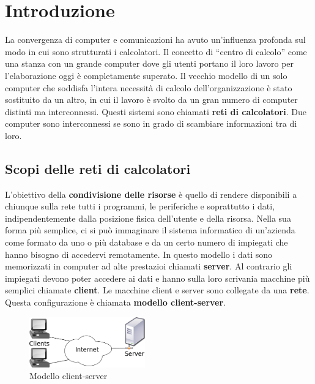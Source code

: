 \section{Introduzione}

La convergenza di computer e comunicazioni ha avuto un'influenza profonda sul modo in cui sono strutturati i calcolatori. Il concetto di ``centro di calcolo'' come una stanza con un grande computer dove gli utenti portano il loro lavoro per l'elaborazione oggi è completamente superato. Il vecchio modello di un solo computer che soddisfa l'intera necessità di calcolo dell'organizzazione è stato sostituito da un altro, in cui il lavoro è svolto da un gran numero di computer distinti ma interconnessi. Questi sistemi sono chiamati \textbf{reti di calcolatori}. Due computer sono interconnessi se sono in grado di scambiare informazioni tra di loro.

\subsection{Scopi delle reti di calcolatori}

L'obiettivo della \textbf{condivisione delle risorse} è quello di rendere disponibili a chiunque sulla rete tutti i programmi, le periferiche e soprattutto i dati, indipendentemente dalla posizione fisica dell'utente e della risorsa.
\linebreak
\linebreak
Nella sua forma più semplice, ci si può immaginare il sistema informatico di un'azienda come formato da uno o più database e da un certo numero di impiegati che hanno bisogno di accedervi remotamente. In questo modello i dati sono memorizzati in computer ad alte prestazioi chiamati \textbf{server}. Al contrario gli impiegati devono poter accedere ai dati e hanno sulla loro scrivania macchine più semplici chiamate \textbf{client}. Le macchine client e server sono collegate da una \textbf{rete}. Questa configurazione è chiamata \textbf{modello client-server}.

\begin{figure}[htbp]
\centering
\includegraphics[width=50mm]{images/client-server-model.png}
\caption{Modello client-server}
\end{figure}

